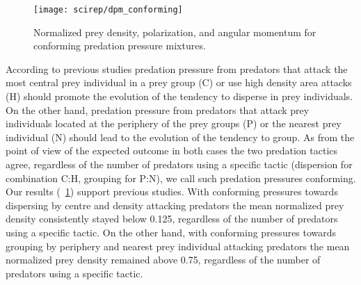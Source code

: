 \begin{figure}
	\texttt{[image: scirep/dpm\_conforming]}
	\caption{Normalized prey density, polarization, and angular momentum for conforming predation pressure mixtures.}	\label{figure:conforming}
\end{figure}

According to previous studies\cite{biswas2014causes,kunz2006prey,olson2013predator,olson2016evolution} predation pressure from predators that attack the most central prey individual in a prey group (C) or use high density area attacks (H) should promote the evolution of the tendency to disperse in prey individuals. On the other hand, predation pressure from predators that attack prey individuals located at the periphery of the prey groups (P) or the nearest prey individual (N) should lead to the evolution of the tendency to group. As from the point of view of the expected outcome in both cases the two predation tactics agree, regardless of the number of predators using a specific tactic (dispersion for combination C:H, grouping for P:N), we call such predation pressures conforming. Our results (\figurename~\ref{figure:conforming}) support previous studies. With conforming pressures towards dispersing by centre and density attacking predators the mean normalized prey density consistently stayed below \num{0.125}, regardless of the number of predators using a specific tactic. On the other hand, with conforming pressures towards grouping by periphery and nearest prey individual attacking predators the mean normalized prey density remained above \num{0.75}, regardless of the number of predators using a specific tactic.

